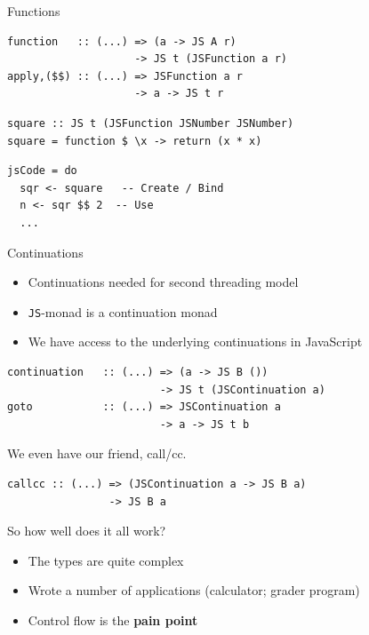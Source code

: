 \documentclass{beamer}
\begin{document}
\begin{frame}[fragile]{Functions}

\begin{codeblock}[0.8]
\begin{verbatim}
function   :: (...) => (a -> JS A r) 
                    -> JS t (JSFunction a r)
apply,($$) :: (...) => JSFunction a r 
                    -> a -> JS t r
\end{verbatim}
\end{codeblock}


\begin{codeblock}[0.8]
\begin{verbatim}
square :: JS t (JSFunction JSNumber JSNumber)
square = function $ \x -> return (x * x)
\end{verbatim}
\end{codeblock}

\begin{codeblock}[0.8]
\begin{verbatim}
jsCode = do
  sqr <- square   -- Create / Bind
  n <- sqr $$ 2  -- Use
  ...
\end{verbatim}
\end{codeblock}
\end{frame}

\begin{frame}[fragile]{Continuations}

\begin{itemize}
\item Continuations needed for second threading model
\item \verb`JS`-monad is a continuation monad
\item We have access to the underlying continuations in JavaScript
\end{itemize}


\begin{codeblock}[0.9]
\begin{verbatim}
continuation   :: (...) => (a -> JS B ()) 
                        -> JS t (JSContinuation a)
goto           :: (...) => JSContinuation a
                        -> a -> JS t b
\end{verbatim}
\end{codeblock}

We even have our friend, call/cc.

\begin{codeblock}[0.9]
\begin{verbatim}
callcc :: (...) => (JSContinuation a -> JS B a)
                -> JS B a
\end{verbatim}
\end{codeblock}

\end{frame}


\begin{frame}[fragile]{So how well does it all work?}
        
\begin{itemize}
\item The types are quite complex
\item Wrote a number of applications (calculator; grader program)
\item Control flow is the {\bf pain point}
\end{itemize}                

\end{frame}
\end{document}
